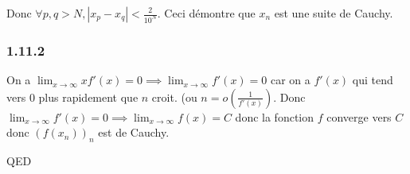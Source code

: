 \documentclass[]{book}
\theoremstyle{definition}
\begin{document}
Donc $\forall p, q > N, |x_p - x_q| < \frac{2}{10^N}$. Ceci d\'emontre que $x_n$ est une suite de Cauchy.

\subsubsection*{1.11.2}
On a $\lim_{x \to \infty}xf'(x) = 0 \implies \lim_{x \to \infty}f'(x) = 0$ car on a $f'(x)$ qui tend vers 0 plus rapidement que $n$ croit. (ou $n = o(\frac{1}{f'(x)})$. Donc $\lim_{x \to \infty}f'(x) = 0 \implies  \lim_{x \to \infty}f(x) = C$ donc la fonction $f$ converge vers $C$ donc $(f(x_n))_n$ est de Cauchy.




QED
\end{document}
